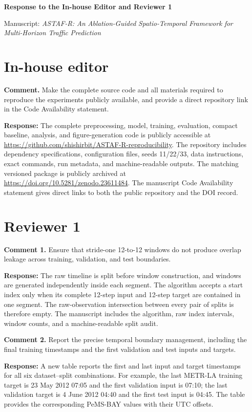 \documentclass[11pt]{article}
\newcommand{\response}[1]{\par\noindent\textcolor{responseblue}{\textbf{Response:} #1}\par}
\begin{document}
\begin{center}\Large\textbf{Response to the In-house Editor and Reviewer 1}\end{center}
\noindent Manuscript: \textit{ASTAF-R: An Ablation-Guided Spatio-Temporal Framework for Multi-Horizon Traffic Prediction}

\section*{In-house editor}
\textbf{Comment.} Make the complete source code and all materials required to reproduce the experiments publicly available, and provide a direct repository link in the Code Availability statement.

\response{The complete preprocessing, model, training, evaluation, compact baseline, analysis, and figure-generation code is publicly accessible at \url{https://github.com/shishirbit/ASTAF-R-reproducibility}. The repository includes dependency specifications, configuration files, seeds 11/22/33, data instructions, exact commands, run metadata, and machine-readable outputs. The matching versioned package is publicly archived at \url{https://doi.org/10.5281/zenodo.23611484}. The manuscript Code Availability statement gives direct links to both the public repository and the DOI record.}

\section*{Reviewer 1}
\textbf{Comment 1.} Ensure that stride-one 12-to-12 windows do not produce overlap leakage across training, validation, and test boundaries.

\response{The raw timeline is split before window construction, and windows are generated independently inside each segment. The algorithm accepts a start index only when its complete 12-step input and 12-step target are contained in one segment. The raw-observation intersection between every pair of splits is therefore empty. The manuscript includes the algorithm, raw index intervals, window counts, and a machine-readable split audit.}

\textbf{Comment 2.} Report the precise temporal boundary management, including the final training timestamps and the first validation and test inputs and targets.

\response{A new table reports the first and last input and target timestamps for all six dataset--split combinations. For example, the last METR-LA training target is 23 May 2012 07:05 and the first validation input is 07:10; the last validation target is 4 June 2012 04:40 and the first test input is 04:45. The table provides the corresponding PeMS-BAY values with their UTC offsets.}
\end{document}
